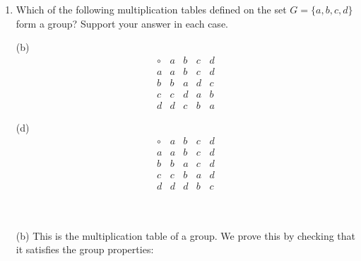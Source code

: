 \documentclass[12pt,reqno]{amsart}
\newcommand{\<}{\ensuremath{\langle}}
\renewcommand{\>}{\ensuremath{\rangle}}
\begin{document}
\begin{enumerate}
\bigskip

\item[{\bf 2.}]
Which of the following multiplication tables defined on the set $G =
\{ a, b, c, d \}$ form a group? Support your answer in each case. 

\begin{multicols}{2}
(b)
\[
\begin{array}{c|cccc}
\circ & a & b & c & d \\
\hline
a & a & b & c & d \\
b & b & a & d & c \\
c & c & d & a & b \\
d & d & c & b & a
\end{array}
\]
 
(d)
\[
\begin{array}{c|cccc}
\circ & a & b & c & d \\
\hline
a & a & b & c & d \\
b & b & a & c & d \\
c & c & b & a & d \\
d & d & d & b & c
\end{array}
\]
\end{multicols}

\medskip

\\
\\
(b) This is the multiplication table of a group.  We prove this by checking that
it satisfies the group properties:


\end{enumerate}
\end{document}
